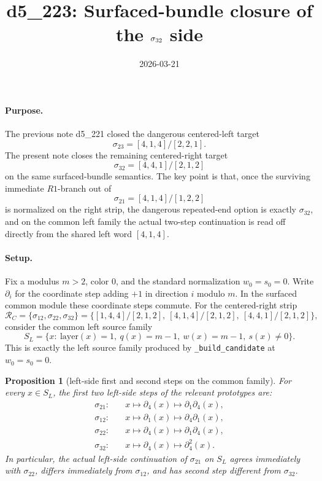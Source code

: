 \documentclass[11pt]{article}
\title{d5\_223: Surfaced-bundle closure of the \(\sigR\) side}
\author{}
\date{2026-03-21}
\newtheorem{proposition}{Proposition}
\theoremstyle{remark}
\newcommand{\sig}[2]{\sigma_{#1#2}}
\newcommand{\sigA}{\sig{2}{1}}
\newcommand{\sigB}{\sig{2}{2}}
\newcommand{\sigC}{\sig{2}{3}}
\newcommand{\sigL}{\sig{1}{2}}
\newcommand{\sigR}{\sig{3}{2}}
\newcommand{\CR}{\mathcal R_C}
\begin{document}
\maketitle

\paragraph{Purpose.}
The previous note d5\_221 closed the dangerous centered-left target
\[
\sigC=[4,1,4]/[2,2,1].
\]
The present note closes the remaining centered-right target
\[
\sigR=[4,4,1]/[2,1,2]
\]
on the same surfaced-bundle semantics.  The key point is that, once the
surviving immediate \(R1\)-branch out of
\[
\sigA=[4,1,4]/[1,2,2]
\]
is normalized on the right strip, the dangerous repeated-end option is exactly
\(\sigR\), and on the common left family the actual two-step continuation is
read off directly from the shared left word \([4,1,4]\).

\paragraph{Setup.}
Fix a modulus \(m>2\), color \(0\), and the standard normalization \(w_0=s_0=0\).
Write \(\partial_i\) for the coordinate step adding \(+1\) in direction \(i\)
modulo \(m\).  In the surfaced common module these coordinate steps commute.
For the centered-right strip
\[
\CR=\{\sigL,\sigB,\sigR\}
=\bigl\{[1,4,4]/[2,1,2],\ [4,1,4]/[2,1,2],\ [4,4,1]/[2,1,2]\bigr\},
\]
consider the common left source family
\[
S_L=\{x:\ \mathrm{layer}(x)=1,\ q(x)=m-1,\ w(x)=m-1,\ s(x)\neq 0\}.
\]
This is exactly the left source family produced by
\texttt{\_build\_candidate} at \(w_0=s_0=0\).

\begin{proposition}[left-side first and second steps on the common family]
\label{prop:sigma32-left-two-step-formulas}
For every \(x\in S_L\), the first two left-side steps of the relevant prototypes
are:
\begin{align*}
\sigA:&\quad x\mapsto \partial_4(x)\mapsto \partial_1\partial_4(x),\\
\sigL:&\quad x\mapsto \partial_1(x)\mapsto \partial_4\partial_1(x),\\
\sigB:&\quad x\mapsto \partial_4(x)\mapsto \partial_1\partial_4(x),\\
\sigR:&\quad x\mapsto \partial_4(x)\mapsto \partial_4^2(x).
\end{align*}
In particular, the actual left-side continuation of \(\sigA\) on \(S_L\)
agrees immediately with \(\sigB\), differs immediately from \(\sigL\), and has
second step different from \(\sigR\).
\end{proposition}
\end{document}
